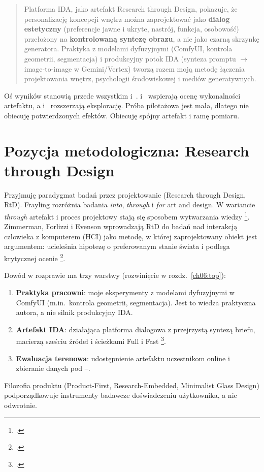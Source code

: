 \begin{quote}
Platforma IDA, jako artefakt Research through Design, pokazuje, że personalizację koncepcji wnętrz można zaprojektować jako \textbf{dialog estetyczny} (preferencje jawne i ukryte, nastrój, funkcja, osobowość) przełożony na \textbf{kontrolowaną syntezę obrazu}, a nie jako czarną skrzynkę generatora.
Praktyka z modelami dyfuzyjnymi (ComfyUI, kontrola geometrii, segmentacja) i produkcyjny potok IDA (synteza promptu $\rightarrow$ image-to-image w Gemini/Vertex) tworzą razem moją metodę łączenia projektowania wnętrz, psychologii środowiskowej i mediów generatywnych.
\end{quote}

Oś wyników stanowią przede wszystkim  i~.  i~ wspierają ocenę wykonalności artefaktu, a  i~ rozszerzają eksplorację.
Próba pilotażowa jest mała, dlatego nie obiecuję potwierdzonych efektów. Obiecuję spójny artefakt i ramę pomiaru.

\section{Pozycja metodologiczna: Research through Design}
\label{ch01:sec:rtd}

Przyjmuję paradygmat badań przez projektowanie (Research through Design, RtD).
Frayling rozróżnia badania \emph{into}, \emph{through} i \emph{for} art and design. W wariancie \emph{through} artefakt i proces projektowy stają się sposobem wytwarzania wiedzy \footcite{frayling1993research}.
Zimmerman, Forlizzi i Evenson wprowadzają RtD do badań nad interakcją człowieka z komputerem (HCI) jako metodę, w której zaprojektowany obiekt jest argumentem: ucieleśnia hipotezę o preferowanym stanie świata i podlega krytycznej ocenie \footcite{zimmerman2007rtd}.

Dowód w rozprawie ma trzy warstwy (rozwinięcie w rozdz.~\ref{ch06:top}):
\begin{enumerate}
  \item[(A)] \textbf{Praktyka pracowni}: moje eksperymenty z modelami dyfuzyjnymi w ComfyUI (m.in.\ kontrola geometrii, segmentacja). Jest to wiedza praktyczna autora, a nie silnik produkcyjny IDA.
  \item[(B)] \textbf{Artefakt IDA}: działająca platforma dialogowa z przejrzystą syntezą briefu, macierzą sześciu źródeł i ścieżkami Full i Fast \footcite{idaPlatform2026}.
  \item[(C)] \textbf{Ewaluacja terenowa}: udostępnienie artefaktu uczestnikom online i zbieranie danych pod --.
\end{enumerate}
Filozofia produktu (Product-First, Research-Embedded, Minimalist Glass Design) podporządkowuje instrumenty badawcze doświadczeniu użytkownika, a nie odwrotnie.


